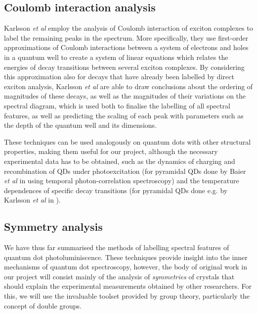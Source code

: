 \documentclass[12pt]{article}
\begin{document}
\subsection{Coulomb interaction analysis}
Karlsson \textit{et al} employ the analysis of Coulomb interaction of exciton complexes to label the remaining peaks in the spectrum. More specifically, they use first-order approximations of Coulomb interactions between a system of electrons and holes in a quantum well to create a system of linear equations which relates the energies of decay transitions between several exciton complexes. By considering this approximation also for decays that have already been labelled by direct exciton analysis, Karlsson \textit{et al} are able to draw conclusions about the ordering of magnitudes of these decays, as well as the magnitudes of their variations on the spectral diagram, which is used both to finalise the labelling of all spectral features, as well as predicting the scaling of each peak with parameters such as the depth of the quantum well and its dimensions.

These techniques can be used analogously on quantum dots with other structural properties, making them useful for our project, although the necessary experimental data has to be obtained, such as the dynamics of charging and recombination of QDs under photoexcitation (for pyramidal QDs done by Baier \textit{et al} in \cite{pyramid_dynamics} using temporal photon-correlation spectroscopy) and the temperature dependences of specific decay transitions (for pyramidal QDs done e.g. by Karlsson \textit{et al} in \cite{pyramid_temperature}).

\subsection{Symmetry analysis}

We have thus far summarised the methods of labelling spectral features of quantum dot photoluminiscence. These techniques provide insight into the inner mechanisms of quantum dot spectroscopy, however, the body of original work in our project will consist mainly of the analysis of \textit{symmetries} of crystals that should explain the experimental measurements obtained by other researchers. For this, we will use the invaluable toolset provided by group theory, particularly the concept of double groups.
\end{document}

